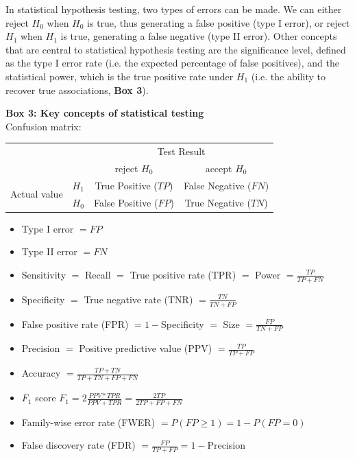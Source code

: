 In statistical hypothesis testing, two types of errors can be made. 
We can either reject $H_0$ when $H_0$ is true, thus generating a false positive (type I error), or reject $H_1$ when $H_1$ is true, generating a false negative (type II error).
Other concepts that are central to statistical hypothesis testing are the significance level, defined as the type I error rate (i.e. the expected percentage of false positives), and the statistical power, which is the true positive rate under $H_1$ (i.e. the ability to recover true associations, \textbf{Box 3}).


\newpage

\begin{Comment}
\hspace{-2.5mm}\textbf{Box 3: Key concepts of statistical testing}\label{box3}\\
Confusion matrix:

\begin{center}
\begin{tabular}{l|l|c|c|}
\multicolumn{2}{c}{}&\multicolumn{2}{c}{Test Result}\\
\cline{3-4}
\multicolumn{2}{c|}{}&reject $H_0$&accept $H_0$\\
\cline{2-4}
\multirow{2}{*}{Actual value}& $H_1$ & True Positive ($TP$) & False Negative ($FN$)\\
\cline{2-4}
& $H_0$ & False Positive ($FP$) & True Negative ($TN$)\\
\cline{2-4}
\end{tabular}
\end{center}

\begin{itemize}
    \item Type I error $= FP$
    \item Type II error $= FN$
    \item Sensitivity $=$ Recall $=$ True positive rate (TPR) $=$ Power $=\frac{TP}{TP+FN}$
    \item Specificity $=$ True negative rate (TNR) $=\frac{TN}{TN+FP}$
    \item False positive rate (FPR) $= 1-$Specificity $=$ Size $=\frac{FP}{TN+FP}$
    \item Precision $=$ Positive predictive value (PPV) $=\frac{TP}{TP+FP}$
    \item Accuracy $=\frac{TP+TN}{TP+TN+FP+FN}$
    \item $F_1$ score $F_1=2 \frac{PPV*TPR}{PPV+TPR}=\frac{2TP}{2TP+FP+FN}$
    \item Family-wise error rate (FWER) $=P(FP \geq 1)= 1 - P(FP=0)$
    \item False discovery rate (FDR) $=\frac{FP}{TP+FP}= 1- $Precision
\end{itemize}

\vfill

\end{Comment}


